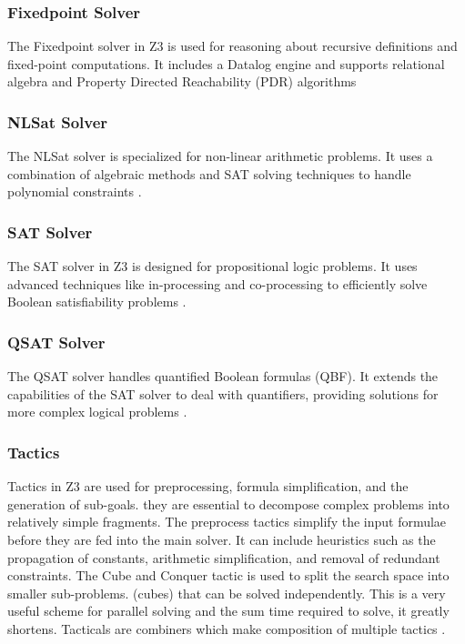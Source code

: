 \documentclass[]{rptuseminar}
\begin{document}
\subsubsection*{Fixedpoint Solver}
The Fixedpoint solver in Z3 is used for reasoning about recursive definitions and fixed-point computations. 
It includes a Datalog engine and supports relational algebra and Property Directed Reachability (PDR) algorithms \cite{nikolaj_bjorner_programming_nodate} 

\subsubsection*{NLSat Solver}
The NLSat solver is specialized for non-linear arithmetic problems. 
It uses a combination of algebraic methods and SAT solving techniques to handle polynomial constraints \cite{nikolaj_bjorner_programming_nodate}.

\subsubsection*{SAT Solver}
The SAT solver in Z3 is designed for propositional logic problems. It uses advanced techniques like in-processing 
and co-processing to efficiently solve Boolean satisfiability problems \cite{nikolaj_bjorner_programming_nodate}.

\subsubsection*{QSAT Solver}
The QSAT solver handles quantified Boolean formulas (QBF). It extends the capabilities of the SAT solver to deal with quantifiers, 
providing solutions for more complex logical problems \cite{nikolaj_bjorner_programming_nodate}.


\subsubsection{Tactics}
Tactics in Z3 are used for preprocessing, formula simplification, and the generation of sub-goals. they
are essential to decompose complex problems into relatively simple fragments. The preprocess tactics simplify the input formulae before they are fed into the main solver. It can include heuristics such as the propagation of constants, arithmetic simplification, and removal of redundant constraints. The Cube and Conquer tactic is used to split the search space into smaller sub-problems. (cubes) that can be solved independently. This is a very useful scheme for parallel solving
and the sum time required to solve, it greatly shortens. Tacticals are combiners which make composition of multiple tactics \cite{nikolaj_bjorner_programming_nodate}.
\end{document}
